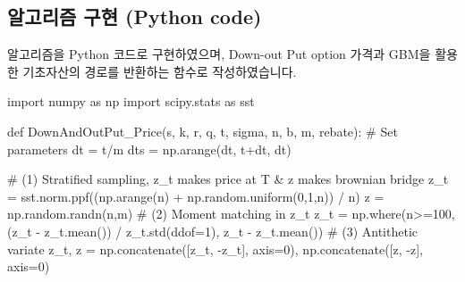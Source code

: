 \documentclass[
  a4paper,
  DIV=11,
  numbers=noendperiod]{scrreprt}
\newenvironment{Shaded}{\begin{snugshade}}{\end{snugshade}}
\newcommand{\CommentTok}[1]{\textcolor[rgb]{0.37,0.37,0.37}{#1}}
\newcommand{\DecValTok}[1]{\textcolor[rgb]{0.68,0.00,0.00}{#1}}
\newcommand{\ImportTok}[1]{\textcolor[rgb]{0.00,0.46,0.62}{#1}}
\newcommand{\KeywordTok}[1]{\textcolor[rgb]{0.00,0.23,0.31}{#1}}
\newcommand{\NormalTok}[1]{\textcolor[rgb]{0.00,0.23,0.31}{#1}}
\newcommand{\OperatorTok}[1]{\textcolor[rgb]{0.37,0.37,0.37}{#1}}
\begin{document}
\subsection*{알고리즘 구현 (Python
code)}\label{uxc54cuxace0uxb9acuxc998-uxad6cuxd604-python-code}

알고리즘을 Python 코드로 구현하였으며, Down-out Put option 가격과 GBM을
활용한 기초자산의 경로를 반환하는 함수로 작성하였습니다.

\begin{Shaded}
\begin{Highlighting}[]
\ImportTok{import}\NormalTok{ numpy }\ImportTok{as}\NormalTok{ np}
\ImportTok{import}\NormalTok{ scipy.stats }\ImportTok{as}\NormalTok{ sst}

\KeywordTok{def}\NormalTok{ DownAndOutPut\_Price(s, k, r, q, t, sigma, n, b, m, rebate):}
    \CommentTok{\# Set parameters}
\NormalTok{    dt }\OperatorTok{=}\NormalTok{ t}\OperatorTok{/}\NormalTok{m}
\NormalTok{    dts }\OperatorTok{=}\NormalTok{ np.arange(dt, t}\OperatorTok{+}\NormalTok{dt, dt)}

    \CommentTok{\# (1) Stratified sampling, z\_t makes price at T \& z makes brownian bridge}
\NormalTok{    z\_t }\OperatorTok{=}\NormalTok{ sst.norm.ppf((np.arange(n) }\OperatorTok{+}\NormalTok{ np.random.uniform(}\DecValTok{0}\NormalTok{,}\DecValTok{1}\NormalTok{,n)) }\OperatorTok{/}\NormalTok{ n)}
\NormalTok{    z }\OperatorTok{=}\NormalTok{ np.random.randn(n,m)}
    \CommentTok{\# (2) Moment matching in z\_t}
\NormalTok{    z\_t }\OperatorTok{=}\NormalTok{ np.where(n}\OperatorTok{\textgreater{}=}\DecValTok{100}\NormalTok{, (z\_t }\OperatorTok{{-}}\NormalTok{ z\_t.mean()) }\OperatorTok{/}\NormalTok{ z\_t.std(ddof}\OperatorTok{=}\DecValTok{1}\NormalTok{), z\_t }\OperatorTok{{-}}\NormalTok{ z\_t.mean())}
    \CommentTok{\# (3) Antithetic variate}
\NormalTok{    z\_t, z }\OperatorTok{=}\NormalTok{ np.concatenate([z\_t, }\OperatorTok{{-}}\NormalTok{z\_t], axis}\OperatorTok{=}\DecValTok{0}\NormalTok{), np.concatenate([z, }\OperatorTok{{-}}\NormalTok{z], axis}\OperatorTok{=}\DecValTok{0}\NormalTok{)}


\end{Highlighting}
\end{Shaded}
\end{document}
